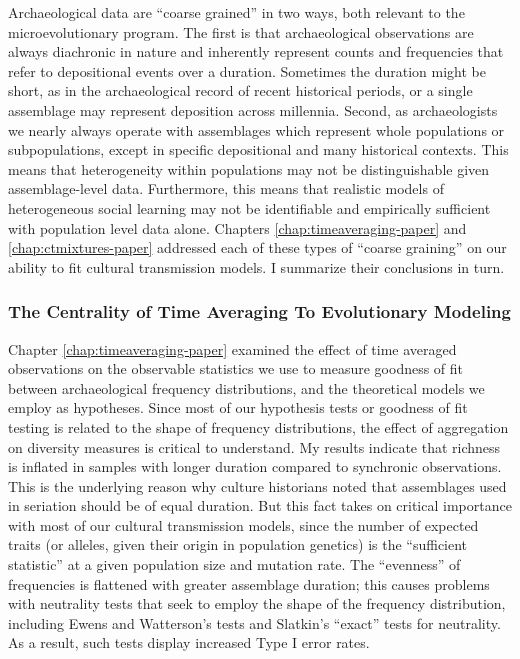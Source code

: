 Archaeological data are ``coarse grained'' in two ways, both relevant to the microevolutionary program.  The first is that archaeological observations are always diachronic in nature and inherently represent counts and frequencies that refer to depositional events over a duration.  Sometimes the duration might be short, as in the archaeological record of recent historical periods, or a single assemblage may represent deposition across millennia.  Second, as archaeologists we nearly always operate with assemblages which represent whole populations or subpopulations, except in specific depositional and many historical contexts.  This means that heterogeneity within populations may not be distinguishable given assemblage-level data.  Furthermore, this means that realistic models of heterogeneous social learning may not be identifiable and empirically sufficient with population level data alone.  Chapters \ref{chap:timeaveraging-paper} and \ref{chap:ctmixtures-paper} addressed each of these types of ``coarse graining'' on our ability to fit cultural transmission models.  I summarize their conclusions in turn.

\subsubsection{The Centrality of Time Averaging To Evolutionary Modeling}\label{conc:sec:conc-timeaveraging}

Chapter \ref{chap:timeaveraging-paper} examined the effect of time averaged observations on the observable statistics we use to measure goodness of fit between archaeological frequency distributions, and the theoretical models we employ as hypotheses.  Since most of our hypothesis tests or goodness of fit testing is related to the shape of frequency distributions, the effect of aggregation on diversity measures is critical to understand.  My results indicate that richness is inflated in samples with longer duration compared to synchronic observations.  This is the underlying reason why culture historians noted that assemblages used in seriation should be of equal duration.  But this fact takes on critical importance with most of our cultural transmission models, since the number of expected traits (or alleles, given their origin in population genetics) is the ``sufficient statistic'' at a given population size and mutation rate.  The ``evenness'' of frequencies is flattened with greater assemblage duration; this causes problems with neutrality tests that seek to employ the shape of the frequency distribution, including Ewens and Watterson's tests and Slatkin's ``exact'' tests for neutrality.  As a result, such tests display increased Type I error rates.  

